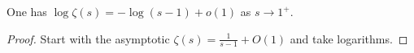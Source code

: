 \begin{sublemma}
\label{log-zeta-limit}
\leanok
One has $\log \zeta(s) = - \log(s-1) + o(1)$ as $s \to 1^+$.
\end{sublemma}
\begin{proof}
\leanok
Start with the asymptotic $\zeta(s) = \frac{1}{s-1} + O(1)$ and take logarithms.
\end{proof}
